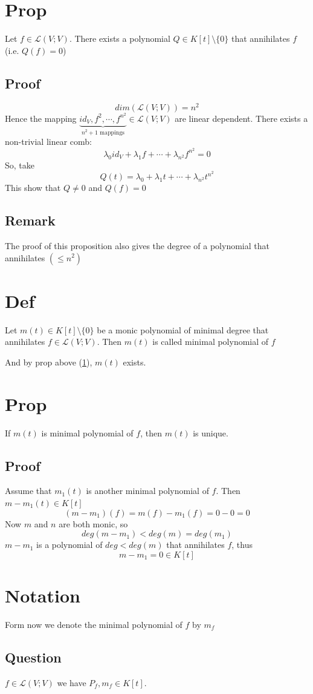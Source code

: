 \documentclass{book}
\begin{document}
\section{Prop}
\label{Prop.48.17}
Let $f\in \mathscr{L}(V;V)$. There exists a polynomial $Q\in K[t]\setminus\{0\}$ that annihilates $f$ (i.e. $Q(f)=0$)
\subsection*{Proof}
$$dim(\mathscr{L}(V;V))=n^2$$
Hence the mapping $\underbrace{id_V,f^2,\cdots,f^{n^2}}\limits_{n^2+1\text{ mappings}}\in\mathscr{L}(V;V)$ are linear dependent. There exists a non-trivial linear comb:
$$\lambda_0id_V+\lambda_1f+\cdots+\lambda_{n^2}f^{n^2}=0$$
So, take $$Q(t)=\lambda_0+\lambda_1t+\cdots+\lambda_{n^2}t^{n^2}$$ This show that $Q\neq0$ and $Q(f)=0$
\subsection*{Remark}The proof of this proposition also gives the degree of a polynomial that annihilates $(\leq n^2)$
\section{Def}
Let $m(t)\in K[t]\setminus\{0\}$ be a monic polynomial of minimal degree that annihilates $f\in \mathscr{L}(V;V)$. Then $m(t)$ is called minimal polynomial of $f$

And by prop above (\ref{Prop.48.17}), $m(t)$ exists.
\section{Prop}
If $m(t)$ is minimal polynomial of $f$, then $m(t)$ is unique.
\subsection*{Proof}
Assume that $m_1(t)$ is another minimal polynomial of $f$. Then $m-m_1(t)\in K[t]$
$$(m-m_1)(f)=m(f)-m_1(f)=0-0=0$$
Now $m$ and $n$ are both monic, so $$deg(m-m_1)<deg(m)=deg(m_1)$$
$m-m_1$ is a polynomial of $deg<deg(m)$ that annihilates $f$, thus $$m-m_1=0\in K[t]$$
\section*{Notation}
Form now we denote the minimal polynomial of $f$ by $m_f$
\subsection*{Question}
$f\in\mathscr{L}(V;V)$ we have $P_f,m_f\in K[t]$.
\end{document}
